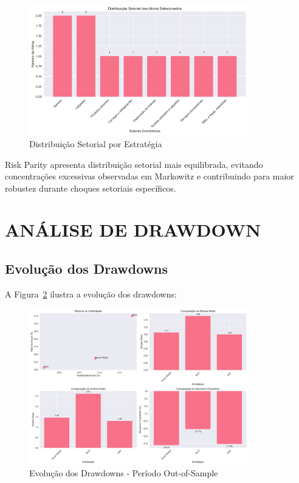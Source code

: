 \begin{figure}[H]
\centering
\includegraphics[width=0.85\textwidth]{figures/distribuicao_setorial.png}
\caption{Distribuição Setorial por Estratégia}
\label{fig:distribuicao_setorial}
\end{figure}

Risk Parity apresenta distribuição setorial mais equilibrada, evitando concentrações excessivas observadas em Markowitz e contribuindo para maior robustez durante choques setoriais específicos.

\section{ANÁLISE DE DRAWDOWN}

\subsection{Evolução dos Drawdowns}

A Figura~\ref{fig:performance_comparativa} ilustra a evolução dos drawdowns:

\begin{figure}[H]
\centering
\includegraphics[width=0.85\textwidth]{figures/performance_comparativa.png}
\caption{Evolução dos Drawdowns - Período Out-of-Sample}
\label{fig:performance_comparativa}
\end{figure}

